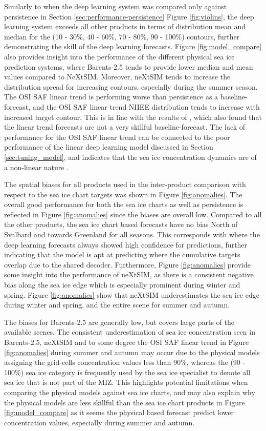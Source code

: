 \documentclass[../main/thesis]{subfiles}
\begin{document}
Similarly to when the deep learning system was compared only against persistence in Section \ref{sec:performance-persistence} Figure \ref{fig:violins}, the deep learning system exceeds all other products in terms of distribution mean and median for the (10 - 30\%, 40 - 60\%, 70 - 80\%, 90 - 100\%) contours, further demonstrating the skill of the deep learning forecasts. Figure \ref{fig:model_compare} also provides insight into the performance of the different physical sea ice prediction systems, where Barents-2.5 tends to provide lower median and mean values compared to NeXtSIM. Moreover, neXtSIM tends to increase the distribution spread for increasing contours, especially during the summer season. The OSI SAF linear trend is performing worse than persistence as a baseline-forecast, and the OSI SAF linear trend NIIEE distribution tends to increase with increased target contour. This is in line with the results of \citet{Grigoryev2022}, which also found that the linear trend forecasts are not a very skillful baseline-forecast. The lack of performance for the OSI SAF linear trend can be connected to the poor performance of the linear deep learning model discussed in Section \ref{sec:tuning_model}, and indicates that the sea ice concentration dynamics are of a non-linear nature \citep{Grigoryev2022}.

The spatial biases for all products used in the inter-product comparison with respect to the sea ice chart targets was shown in Figure \ref{fig:anomalies}. The overall good performance for both the sea ice charts as well as persistence is reflected in Figure \ref{fig:anomalies} since the biases are overall low. Compared to all the other products, the sea ice chart based forecasts have no bias North of Svalbard and towards Greenland for all seasons. This corresponds with where the deep learning forecasts always showed high confidence for predictions, further indicating that the model is apt at predicting where the cumulative targets overlap due to the shared decoder. Furthermore, Figure \ref{fig:anomalies} provide some insight into the performance of neXtSIM, as there is a consistent negative bias along the sea ice edge which is especially prominent during winter and spring. Figure \ref{fig:anomalies} show that neXtSIM underestimates the sea ice edge during winter and spring, and the entire scene for summer and autumn.

The biases for Barents-2.5 are generally low, but covers large parts of the available scenes. The consistent underestimation of sea ice concentration seen in Barents-2.5, neXtSIM and to some degree the OSI SAF linear trend in Figure \ref{fig:anomalies} during summer and autumn may occur due to the physical models assigning the grid-cells concentration values less than 90\%, whereas the (90 - 100\%) sea ice category is frequently used by the sea ice specialist to denote all sea ice that is not part of the MIZ. This highlights potential limitations when comparing the physical models against sea ice charts, and may also explain why the physical models are less skillful than the sea ice chart products in Figure \ref{fig:model_compare} as it seems the physical based forecast predict lower concentration values, especially during summer and autumn.
\end{document}
